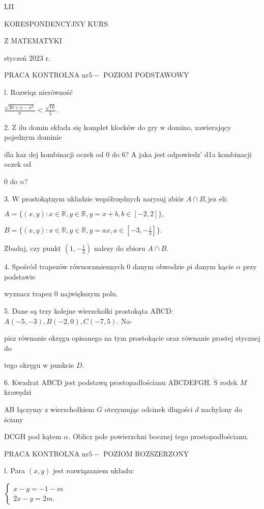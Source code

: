 \documentclass[a4paper,12pt]{article}
\begin{document}
LII

KORESPONDENCYJNY KURS

Z MATEMATYKI

styczeń 2023 r.

PRACA KONTROLNA $\mathrm{n}\mathrm{r} 5-$ POZIOM PODSTAWOWY

l. Rozwiqz nierówność

$\displaystyle \frac{\sqrt{30+x-x^{2}}}{x}<\frac{\sqrt{10}}{5}.$

2. $\mathrm{Z}$ ilu domin składa się komplet klocków do gry $\mathrm{w}$ domino, zawierajqcy pojednym dominie

dla $\mathrm{k}\mathrm{a}\dot{\mathrm{z}}$ dej kombinacji oczek od 0 do 6? A jaka jest odpowiedz' d1a kombinacji oczek od

0 do $n$?

3. $\mathrm{W}$ prostokątnym ukladzie współrzędnych narysuj zbiór $A\cap B, \mathrm{j}\mathrm{e}\dot{\mathrm{z}}$ eli:

$A=\{(x,y):x\in \mathbb{R},y\in \mathbb{R},y=x+b,b\in[-2,2]\},$

$B=\displaystyle \{(x,y):x\in \mathbb{R},y\in \mathbb{R},y=ax,a\in[-3,-\frac{1}{3}]\}.$

Zbadaj, czy punkt $(1,-\displaystyle \frac{1}{2})$ nalezy do zbioru $A\cap B.$

4. Spośród trapezów równoramiennych $0$ danym obwodzie $p\mathrm{i}$ danym kącie $\alpha$ przy podstawie

wyznacz trapez $0$ największym polu.

5. Dane są trzy kolejne wierzcholki prostokąta ABCD: $A(-5,-3), B(-2,0), C(-7,5)$. Na-

pisz równanie okręgu opisanego na tym prostokącie oraz równanie prostej stycznej do

tego okręgu $\mathrm{w}$ punkcie $D.$

6. Kwadrat ABCD jest podstawą prostopadłościanu ABCDEFGH. $\acute{\mathrm{S}}$ rodek $M$ krawędzi

AB łączymy $\mathrm{z}$ wierzchołkiem $G$ otrzymując odcinek dlugości $d$ nachylony do ściany

DCGH pod kątem $\alpha$. Oblicz pole powierzchni bocznej tego prostopadłościanu.




PRACA KONTROLNA $\mathrm{n}\mathrm{r} 5-$ POZIOM ROZSZERZONY

l. Para $(x,y)$ jest rozwiązaniem układu:

$\left\{\begin{array}{l}
x-y=-1-m\\
2x-y=2m.
\end{array}\right.$
\end{document}
